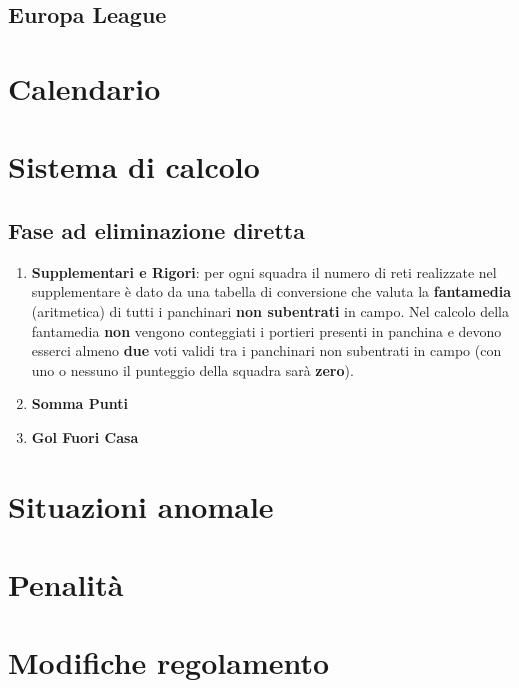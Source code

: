 \documentclass[12pt]{article}
\begin{document}
\subsection{Europa League}

\newpage
\section{Calendario}

\newpage
\section{Sistema di calcolo}
\label{subsec:sistema-di-calcolo}

\subsection{Fase ad eliminazione diretta}
\begin{enumerate}
    \item \textbf{Supplementari e Rigori}: per ogni squadra il numero di reti realizzate nel supplementare è dato da una tabella di conversione che valuta la \textbf{fantamedia} (aritmetica) di tutti i panchinari \textbf{non subentrati} in campo. Nel calcolo della fantamedia \textbf{non} vengono conteggiati i portieri presenti in panchina e devono esserci almeno \textbf{due} voti validi tra i panchinari non subentrati in campo (con uno o nessuno il punteggio della squadra sarà \textbf{zero}).  
    \item \textbf{Somma Punti}
    \item \textbf{Gol Fuori Casa}
\end{enumerate}

\newpage
\section{Situazioni anomale}

\newpage
\section{Penalità}\label{subsec:penalità}

\newpage
\section{Modifiche regolamento}

\newpage
\end{document}
